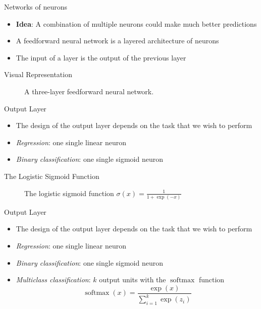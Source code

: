 \documentclass{beamer}
\DeclareMathOperator{\softmax}{softmax}
\begin{document}
	\begin{frame}{Networks of neurons}
		\begin{itemize}
			\item <1-> \textbf{Idea}: A combination of multiple neurons could make much better predictions
			\item <2-> A feedforward neural network is a layered architecture of neurons
			\item <3-> The input of a layer is the output of the previous layer
		\end{itemize}
	\end{frame}
	\begin{frame}{Visual Representation}
		\begin{figure}
			
			\caption{A three-layer feedforward neural network.}
		\end{figure}
	\end{frame}
	\begin{frame}{Output Layer}
		\begin{itemize}
			\item <1-> The design of the output layer depends on the task that we wish to perform
			\item <2-> \emph{Regression}: one single linear neuron
			\item <3-> \emph{Binary classification}: one single sigmoid neuron
		\end{itemize}
	\end{frame}
	\begin{frame}{The Logistic Sigmoid Function}
		\begin{figure}
			\begin{center}
				
			\end{center}
			\caption{The logistic sigmoid function $\sigma(x) = \frac1{1+\exp(-x)}$}
			\label{fig:sigmoid}
		\end{figure}
	\end{frame}
	\begin{frame}{Output Layer}
		\begin{itemize}
			\item <1-> The design of the output layer depends on the task that we wish to perform
			\item <1-> \emph{Regression}: one single linear neuron
			\item <1-> \emph{Binary classification}: one single sigmoid neuron
			\item <1-> \emph{Multiclass classification}: $k$ output units with the $\softmax$ function
			\begin{equation}\label{eq:softmax}
			\softmax(x) = \frac{\exp(x)}{\sum_{i=1}^{k}\exp(z_i)}
			\end{equation}
		\end{itemize}
	\end{frame}
\end{document}
